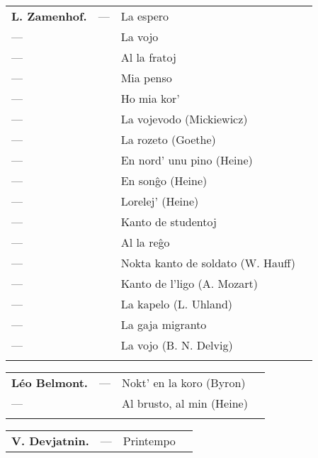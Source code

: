{%
\begin{longtabu} to
\bf L. Zamenhof. & --- & La espero \dotfill & \pageref{laespero}\\
\hfil--- & & La vojo \dotfill & \pageref{lavojo}\\
\hfil--- & & Al la fratoj \dotfill & \pageref{allafratoj}\\
\hfil--- & & Mia penso \dotfill & \pageref{miapenso}\\
\hfil--- & & Ho mia kor' \dotfill & \pageref{homiakor}\\
\hfil--- & & La vojevodo (Mickiewicz) \dotfill & \pageref{vojevodo}\\
\hfil--- & & La rozeto (Goethe) \dotfill & \pageref{rozeto}\\
\hfil--- & & En nord' unu pino (Heine) \dotfill & \pageref{unupino}\\
\hfil--- & & En sonĝo (Heine) \dotfill & \pageref{songxo}\\
\hfil--- & & Lorelej' (Heine) \dotfill & \pageref{lorelej}\\
\hfil--- & & Kanto de studentoj \dotfill & \pageref{studentoj}\\
\hfil--- & & Al la reĝo \dotfill & \pageref{regxo}\\
\hfil--- & & Nokta kanto de soldato (W. Hauff) \dotfill & \pageref{soldato}\\
\hfil--- & & Kanto de l'ligo (A. Mozart) \dotfill & \pageref{ligo}\\
\hfil--- & & La kapelo (L. Uhland) \dotfill & \pageref{kapelo}\\
\hfil--- & & La gaja migranto \dotfill & \pageref{migranto}\\
\hfil--- & & La vojo (B. N. Delvig) \dotfill & \pageref{lavojo2}\\
\vspace*{-38pt}
\end{longtabu}
\begin{longtabu} to
\bf Léo Belmont. &--- & Nokt' en la koro (Byron) \dotfill & \pageref{noktenlakoro}\\
\hfil--- & & Al brusto, al min (Heine) \dotfill & \pageref{albrusto}\\
\vspace*{-38pt}
\end{longtabu}
\begin{longtabu} to
\bf V. Devjatnin. & --- & Printempo \dotfill & \pageref{printempo}\\

\end{longtabu}}
